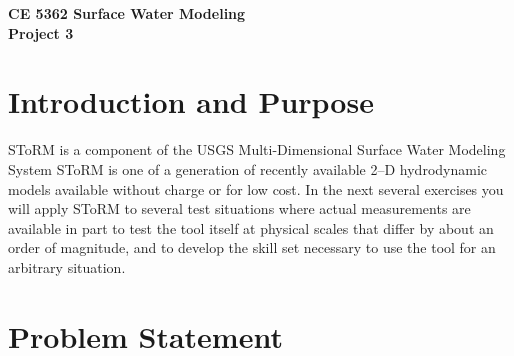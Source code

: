 \documentclass[12pt]{article}
\begin{document}
\begin{center}
{\textbf{{ CE 5362 Surface Water Modeling} \\ {Project 3}}}
\end{center}

\section*{{Introduction and Purpose}}
SToRM is a component of the USGS Multi-Dimensional Surface Water Modeling System \citep{mdswms2012}
SToRM is one of a generation of recently available 2--D hydrodynamic models available without charge or for low cost. 
In the next several exercises you will apply SToRM to several test situations where actual measurements are available in part to test the tool itself at physical scales that differ by about an order of magnitude, and to develop the skill set necessary to use the tool for an arbitrary situation.

\section*{{Problem Statement}}
\end{document}
